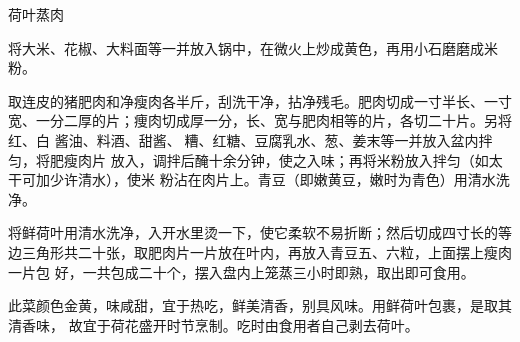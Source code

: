 \begin{recipe}{荷叶蒸肉}

\ingredients


\preparation

\step 将大米、花椒、大料面等一并放入锅中，在微火上炒成黄色，再用小石磨磨成米
粉。

\step 取连皮的猪肥肉和净瘦肉各半斤，刮洗干净，拈净残毛。肥肉切成一寸半长、一寸
宽、一分二厚的片；痩肉切成厚一分，长、宽与肥肉相等的片，各切二十片。另将红、白
酱油、料酒、甜酱、𫃑糟、红糖、豆腐乳水、葱、姜末等一并放入盆内拌匀，将肥瘦肉片
放入，调拌后醃十余分钟，使之入味；再将米粉放入拌匀（如太干可加少许清水），使米
粉沾在肉片上。青豆（即嫩黄豆，嫩时为青色）用清水洗净。

\step 将鲜荷叶用清水洗净，入开水里烫一下，使它柔软不易折断；然后切成四寸长的等
边三角形共二十张，取肥肉片一片放在叶内，再放入青豆五、六粒，上面摆上瘦肉一片包
好，一共包成二十个，摆入盘内上笼蒸三小时即熟，取出即可食用。

\features

此菜颜色金黄，味咸甜，宜于热吃，鲜美清香，别具风味。用鲜荷叶包裹，是取其清香味，
故宜于荷花盛开时节烹制。吃时由食用者自己剥去荷叶。

\end{recipe}

